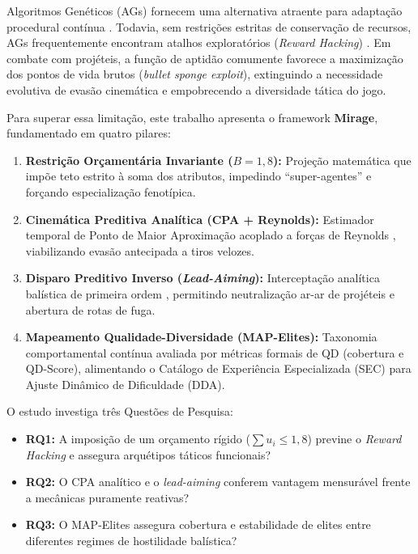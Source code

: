 \documentclass[10pt,conference,twocolumn]{article}
\begin{document}
Algoritmos Genéticos (AGs) fornecem uma alternativa atraente para adaptação procedural contínua \cite{goldberg1989genetic, spronck2006adaptive}. Todavia, sem restrições estritas de conservação de recursos, AGs frequentemente encontram atalhos exploratórios (\textit{Reward Hacking}) \cite{amodei2016concrete}. Em combate com projéteis, a função de aptidão comumente favorece a maximização dos pontos de vida brutos (\textit{bullet sponge exploit}), extinguindo a necessidade evolutiva de evasão cinemática e empobrecendo a diversidade tática do jogo.

Para superar essa limitação, este trabalho apresenta o framework \textbf{Mirage}, fundamentado em quatro pilares:
\begin{enumerate}
    \item \textbf{Restrição Orçamentária Invariante ($B = 1{,}8$):} Projeção matemática que impõe teto estrito à soma dos atributos, impedindo ``super-agentes'' e forçando especialização fenotípica.
    \item \textbf{Cinemática Preditiva Analítica (CPA + Reynolds):} Estimador temporal de Ponto de Maior Aproximação \cite{lee2014collision} acoplado a forças de Reynolds \cite{reynolds1999steering}, viabilizando evasão antecipada a tiros velozes.
    \item \textbf{Disparo Preditivo Inverso (\textit{Lead-Aiming}):} Interceptação analítica balística de primeira ordem \cite{wang2014self}, permitindo neutralização ar-ar de projéteis e abertura de rotas de fuga.
    \item \textbf{Mapeamento Qualidade-Diversidade (MAP-Elites):} Taxonomia comportamental contínua \cite{mouret2015illuminating, cully2015robots, kirk2020exploring} avaliada por métricas formais de QD (cobertura e $\text{QD-Score}$), alimentando o Catálogo de Experiência Especializada (SEC) \cite{glavin2015skilled} para Ajuste Dinâmico de Dificuldade (DDA).
\end{enumerate}

O estudo investiga três Questões de Pesquisa:
\begin{itemize}
    \item \textbf{RQ1:} A imposição de um orçamento rígido ($\sum u_i \le 1{,}8$) previne o \textit{Reward Hacking} e assegura arquétipos táticos funcionais?
    \item \textbf{RQ2:} O CPA analítico e o \textit{lead-aiming} conferem vantagem mensurável frente a mecânicas puramente reativas?
    \item \textbf{RQ3:} O MAP-Elites assegura cobertura e estabilidade de elites entre diferentes regimes de hostilidade balística?
\end{itemize}
\end{document}
